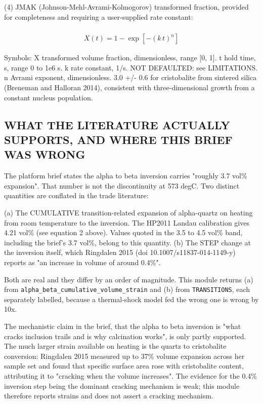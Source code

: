 \documentclass[10pt,a4paper,twoside]{report}
\begin{document}
(4) JMAK (Johnson-Mehl-Avrami-Kolmogorov) transformed fraction, provided for completeness and requiring a user-supplied rate constant:

\begin{equation*}
\begin{gathered}
\\ X(t) = 1 - \exp\left[-(k\,t)^{n}\right]
\end{gathered}
\end{equation*}

Symbols: X   transformed volume fraction, dimensionless, range [0, 1]. t   hold time, s, range 0 to 1e6 s. k   rate constant, 1/s. NOT DEFAULTED: see LIMITATIONS. n   Avrami exponent, dimensionless. 3.0 +/- 0.6 for cristobalite from sintered silica (Breneman and Halloran 2014), consistent with three-dimensional growth from a constant nucleus population.

\subsection*{WHAT THE LITERATURE ACTUALLY SUPPORTS, AND WHERE THIS BRIEF WAS WRONG}

The platform brief states the alpha to beta inversion carries "roughly 3.7 vol\% expansion". That number is not the discontinuity at 573 degC. Two distinct quantities are conflated in the trade literature:

(a) The CUMULATIVE transition-related expansion of alpha-quartz on heating from room temperature to the inversion. The HP2011 Landau calibration gives 4.21 vol\% (see equation 2 above). Values quoted in the 3.5 to 4.5 vol\% band, including the brief's 3.7 vol\%, belong to this quantity. (b) The STEP change at the inversion itself, which Ringdalen 2015 (doi 10.1007/s11837-014-1149-y) reports as "an increase in volume of around 0.4\%".

Both are real and they differ by an order of magnitude. This module returns (a) from \texttt{alpha\_beta\_cumulative\_volume\_strain} and (b) from \texttt{TRANSITIONS}, each separately labelled, because a thermal-shock model fed the wrong one is wrong by 10x.

The mechanistic claim in the brief, that the alpha to beta inversion is "what cracks inclusion trails and is why calcination works", is only partly supported. The much larger strain available on heating is the quartz to cristobalite conversion: Ringdalen 2015 measured up to 37\% volume expansion across her sample set and found that specific surface area rose with cristobalite content, attributing it to "cracking when the volume increases". The evidence for the 0.4\% inversion step being the dominant cracking mechanism is weak; this module therefore reports strains and does not assert a cracking mechanism.
\end{document}
